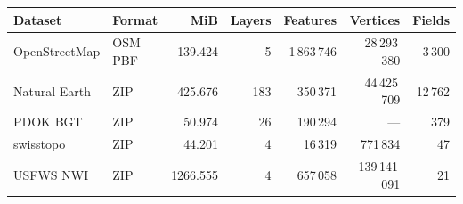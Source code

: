 \begingroup\small\setlength{\tabcolsep}{3pt}
\begin{longtable}{llrrrrr}
\toprule
Dataset & Format & MiB & Layers & Features & Vertices & Fields \\
\midrule
OpenStreetMap & OSM PBF & 139.424 & 5 & 1\,863\,746 & 28\,293\,380 & 3\,300 \\
Natural Earth & ZIP & 425.676 & 183 & 350\,371 & 44\,425\,709 & 12\,762 \\
PDOK BGT & ZIP & 50.974 & 26 & 190\,294 & --- & 379 \\
swisstopo & ZIP & 44.201 & 4 & 16\,319 & 771\,834 & 47 \\
USFWS NWI & ZIP & 1266.555 & 4 & 657\,058 & 139\,141\,091 & 21 \\
\bottomrule
\end{longtable}
\endgroup
